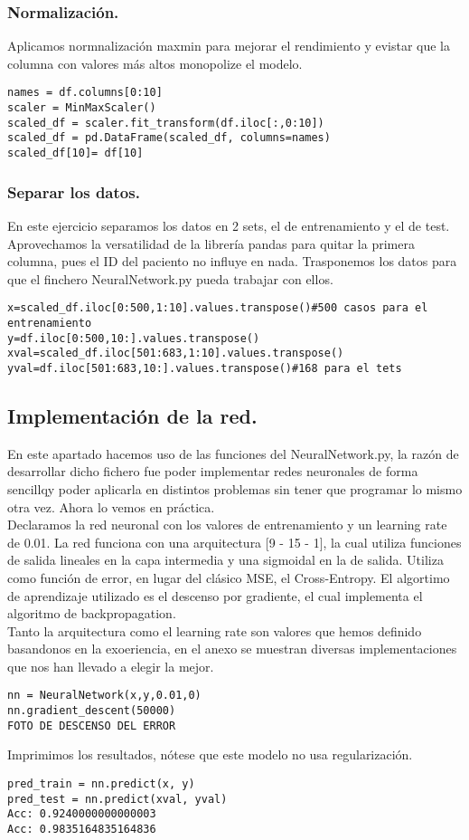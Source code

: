 \documentclass[a4paper,10pt]{article}
\begin{document}
\subsubsection{Normalización.}
Aplicamos normnalización maxmin para mejorar el rendimiento y evistar que la columna con valores más altos monopolize el modelo. 
\begin{lstlisting}
names = df.columns[0:10]
scaler = MinMaxScaler() 
scaled_df = scaler.fit_transform(df.iloc[:,0:10]) 
scaled_df = pd.DataFrame(scaled_df, columns=names)
scaled_df[10]= df[10]
\end{lstlisting}
\subsubsection{Separar los datos.}
En este ejercicio separamos los datos en 2 sets, el de entrenamiento y el de test. Aprovechamos la versatilidad de la librería pandas para quitar la primera columna, pues el ID del paciento no influye en nada. Trasponemos los datos para que el finchero NeuralNetwork.py pueda trabajar con ellos.
\begin{lstlisting}
x=scaled_df.iloc[0:500,1:10].values.transpose()#500 casos para el entrenamiento
y=df.iloc[0:500,10:].values.transpose()
xval=scaled_df.iloc[501:683,1:10].values.transpose()
yval=df.iloc[501:683,10:].values.transpose()#168 para el tets
\end{lstlisting}
\subsection{Implementación de la red.}
En este apartado hacemos uso de las funciones del NeuralNetwork.py, la razón de desarrollar dicho fichero fue poder implementar redes neuronales de forma sencillqy poder aplicarla en distintos problemas sin tener que programar lo mismo otra vez. Ahora lo vemos en práctica.\\
Declaramos la red neuronal con los valores de entrenamiento y un learning rate de 0.01. La red funciona con una arquitectura [9 - 15 - 1], la cual utiliza funciones de salida lineales en la capa intermedia y una sigmoidal en la de salida. Utiliza como función de error, en lugar del clásico MSE, el Cross-Entropy. El algortimo de aprendizaje utilizado es el descenso por gradiente, el cual implementa el algoritmo de backpropagation.\\
Tanto la arquitectura como el learning rate son valores que hemos definido basandonos en la exoeriencia, en el anexo se muestran diversas implementaciones que nos han llevado a elegir la mejor.
\begin{lstlisting}
nn = NeuralNetwork(x,y,0.01,0)
nn.gradient_descent(50000)
FOTO DE DESCENSO DEL ERROR
\end{lstlisting}
Imprimimos los resultados, nótese que este modelo no usa regularización.
\begin{lstlisting}
pred_train = nn.predict(x, y)
pred_test = nn.predict(xval, yval)
Acc: 0.9240000000000003
Acc: 0.9835164835164836
\end{lstlisting}
\end{document}
